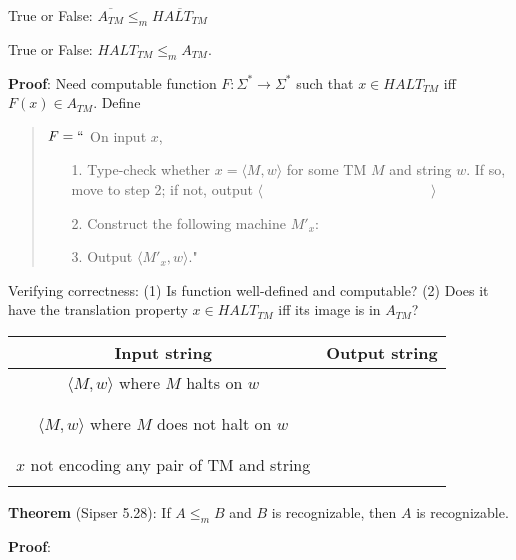 \documentclass[12pt, oneside]{article}
\begin{document}
True or False: $\overline{A_{TM}} \leq_m \overline{HALT_{TM}}$

\vfill

True or False: $HALT_{TM} \leq_m A_{TM}$.

{\bf Proof}: Need computable function  $F: \Sigma^* \to \Sigma^*$  such that  
$x \in HALT_{TM}$ iff $F(x)  \in  A_{TM}$.
Define

\vspace{-15pt}

\begin{quote}
$F =  ``$ On input $x$,
\begin{itemize}
\item[1.] Type-check whether  $x = \langle M, w \rangle$ for some TM $M$ and string $w$. 
If so, move to step 2; if  not, output  $\langle \hspace{2in} \rangle$
\item[2.] Construct the following machine $M'_x$:
\vspace{50pt}
\item[3.] Output $\langle M'_x , w\rangle$."
\end{itemize}
\end{quote}

Verifying correctness: (1) Is function well-defined and computable? (2) Does it have the 
translation property $x \in HALT_{TM}$ iff its image is in $A_{TM}$? 
\begin{center}
\begin{tabular}{|c|c|}
\hline
Input string &  Output string \\
\hline
$\langle M, w \rangle$ where  $M$ halts on $w$ & \phantom{\hspace{4in}} \\
& \\& \\
$\langle M, w \rangle$ where $M$ does not halt on $w$ & \\
& \\&\\
$x$ not encoding any pair of  TM and string   &  \\
& \\
\hline
\end{tabular}
\end{center}

\vfill

\newpage


{\bf Theorem} (Sipser 5.28): If $A \leq_m B$ and $B$ is recognizable, then $A$ is recognizable.

{\bf Proof}: 
\end{document}
